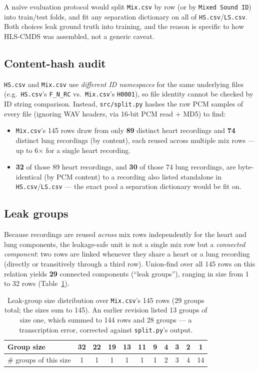 \documentclass[11pt]{article}
\begin{document}
A na\"ive evaluation protocol would split \texttt{Mix.csv} by row (or by
\texttt{Mixed Sound ID}) into train/test folds, and fit any separation
dictionary on all of \texttt{HS.csv}/\texttt{LS.csv}. Both choices leak
ground truth into training, and the reason is specific to how HLS-CMDS was
assembled, not a generic caveat.

\subsection{Content-hash audit}

\texttt{HS.csv} and \texttt{Mix.csv} use \emph{different ID namespaces} for
the same underlying files (e.g.\ \texttt{HS.csv}'s \texttt{F\_N\_RC} vs.\
\texttt{Mix.csv}'s \texttt{H0001}), so file identity cannot be checked by ID
string comparison. Instead, \texttt{src/split.py} hashes the raw PCM samples
of every file (ignoring WAV headers, via 16-bit PCM read + MD5) to find:

\begin{itemize}
  \item \texttt{Mix.csv}'s 145 rows draw from only \textbf{89} distinct
    heart recordings and \textbf{74} distinct lung recordings (by content),
    each reused across multiple mix rows --- up to 6$\times$ for a single
    heart recording.
  \item \textbf{32} of those 89 heart recordings, and \textbf{30} of those
    74 lung recordings, are byte-identical (by PCM content) to a recording
    also listed standalone in \texttt{HS.csv}/\texttt{LS.csv} --- the exact
    pool a separation dictionary would be fit on.
\end{itemize}

\subsection{Leak groups}

Because recordings are reused \emph{across} mix rows independently for the
heart and lung components, the leakage-safe unit is not a single mix row but
a \emph{connected component}: two rows are linked whenever they share a
heart or a lung recording (directly or transitively through a third row).
Union-find over all 145 rows on this relation yields \textbf{29} connected
components (``leak groups''), ranging in size from 1 to 32 rows
(Table~\ref{tab:leakgroups}).

\begin{table}[H]
\centering
\caption{Leak-group size distribution over \texttt{Mix.csv}'s 145 rows (29 groups total; the sizes sum to 145). An earlier revision listed 13 groups of size one, which summed to 144 rows and 28 groups --- a transcription error, corrected against \texttt{split.py}'s output.}
\label{tab:leakgroups}
\begin{tabular}{@{}lcccccccccc@{}}
\toprule
Group size & 32 & 22 & 19 & 13 & 11 & 9 & 4 & 3 & 2 & 1 \\
\midrule
\# groups of this size & 1 & 1 & 1 & 1 & 1 & 1 & 2 & 3 & 4 & 14 \\
\bottomrule
\end{tabular}
\end{table}
\end{document}
